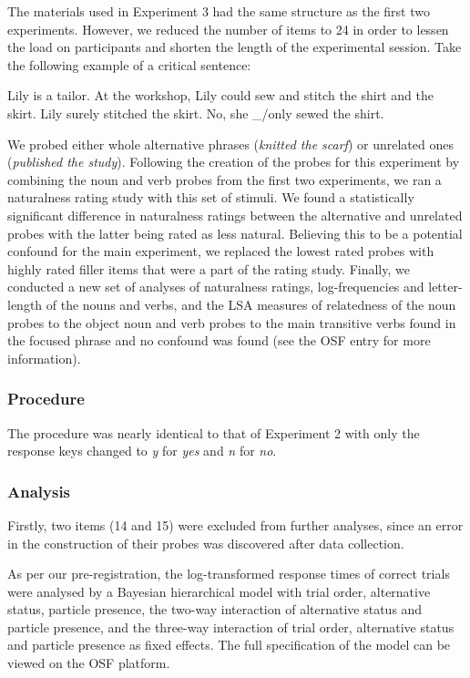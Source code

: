 \documentclass[output=paper,colorlinks,citecolor=brown]{langscibook}
\begin{document}
The materials used in Experiment 3 had the same structure as the first two experiments. However, we reduced the number of items to 24 in order to lessen the load on participants and shorten the length of the experimental session. Take the following example of a critical sentence:

\ea\label{ex:ex12} Lily is a tailor.
\ex\label{ex:ex13} At the workshop, Lily could sew and stitch the shirt and the skirt.
\ex\label{ex:ex14} Lily surely stitched the skirt.
\ex\label{ex:ex15} No, she \_/only sewed the shirt.
\z

We probed either whole alternative phrases (\textit{knitted the scarf}) or unrelated ones (\textit{published the study}). Following the creation of the probes for this experiment by combining the noun and verb probes from the first two experiments, we ran a naturalness rating study with this set of stimuli. We found a statistically significant difference in naturalness ratings between the alternative and unrelated probes with the latter being rated as less natural. Believing this to be a potential confound for the main experiment, we replaced the lowest rated probes with highly rated filler items that were a part of the rating study. Finally, we conducted a new set of analyses of naturalness ratings, log-frequencies and letter-length of the nouns and verbs, and the LSA measures of relatedness of the noun probes to the object noun and verb probes to the main transitive verbs found in the focused phrase and no confound was found (see the OSF entry for more information).

\subsubsection{Procedure}

The procedure was nearly identical to that of Experiment 2 with only the response keys changed to \textit{y} for \textit{yes} and \textit{n} for \textit{no}. 

\subsubsection{Analysis}

Firstly, two items (14 and 15) were excluded from further analyses, since an error in the construction of their probes was discovered after data collection.

As per our pre-registration, the log-transformed response times of correct trials were analysed by a Bayesian hierarchical model with trial order, alternative status, particle presence, the two-way interaction of alternative status and particle presence, and the three-way interaction of trial order, alternative status and particle presence as fixed effects. The full specification of the model can be viewed on the OSF platform.
\end{document}
